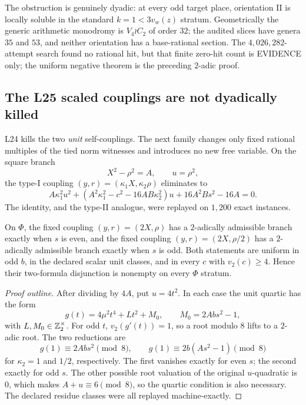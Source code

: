 The obstruction is genuinely dyadic: at every odd target place,
orientation II is locally soluble in the standard \(k=1<3v_w(z)\)
stratum.  Geometrically the generic arithmetic monodromy is
\(V_4\wr C_2\) of order \(32\); the audited slices have genera \(35\)
and \(53\), and neither orientation has a base-rational section.
The \(4{,}026{,}282\)-attempt search found no rational hit, but that
finite zero-hit count is EVIDENCE only; the uniform negative theorem is
the preceding \(2\)-adic proof.

\subsection{The L25 scaled couplings are not dyadically killed}

L24 kills the two \emph{unit} self-couplings.  The next family changes
only fixed rational multiples of the tied norm witnesses and introduces
no new free variable.  On the square branch
\[
 X^2-\rho^2=A,\qquad u=\rho^2,
\]
the type-I coupling \((y,r)=(\kappa_1X,\kappa_2\rho)\) eliminates to
\[
 A\kappa_1^2u^2
 +(A^2\kappa_1^2-c^2-16AB\kappa_2^2)u
 +16A^2Bs^2-16A=0.
\]
The identity, and the type-II analogue, were replayed on \(1{,}200\)
exact instances.

\begin{theorem}
\label{thm:scaledescape}
On \(\Phi\), the fixed coupling \((y,r)=(2X,\rho)\) has a
\(2\)-adically admissible branch exactly when \(s\) is even, and the
fixed coupling \((y,r)=(2X,\rho/2)\) has a \(2\)-adically admissible
branch exactly when \(s\) is odd.  Both statements are uniform in odd
\(b\), in the declared scalar unit classes, and in every \(c\) with
\(v_2(c)\ge4\).  Hence their two-formula disjunction is nonempty on
every \(\Phi\) stratum.
\end{theorem}

\begin{proof}[Proof outline]
After dividing by \(4A\), put \(u=4t^2\).  In each case the unit
quartic has the form
\[
 g(t)=4\mu^2t^4+Lt^2+M_0,\qquad M_0=2Abs^2-1,
\]
with \(L,M_0\in\mathbb{Z}_2^\times\).  For odd \(t\), \(v_2(g'(t))=1\), so a
root modulo \(8\) lifts to a \(2\)-adic root.  The two reductions are
\[
 g(1)\equiv2Abs^2\pmod8,\qquad
 g(1)\equiv2b(As^2-1)\pmod8
\]
for \(\kappa_2=1\) and \(1/2\), respectively.  The first vanishes
exactly for even \(s\); the second exactly for odd \(s\).  The other
possible root valuation of the original \(u\)-quadratic is \(0\), which
makes \(A+u\equiv6\pmod8\), so the quartic condition is also necessary.
The declared residue classes were all replayed machine-exactly.
\end{proof}

